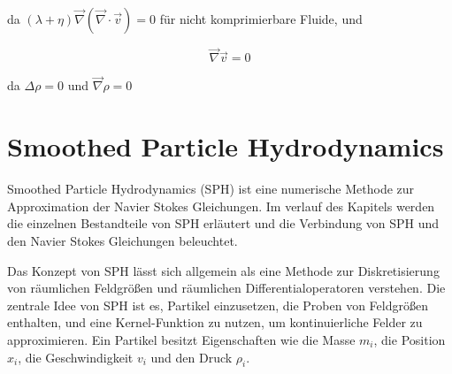 \documentclass[a4paper, 12pt]{article}
\begin{document}
da \((\lambda + \eta)\vec{\nabla}(\vec{\nabla} \cdot \vec{v}) = 0\) für nicht komprimierbare Fluide, und

\begin{equation} \label{equ:einfachKontinuitätsgleichung}
	\vec{\nabla} \vec{v} = 0
\end{equation}

da \(\Delta \rho = 0\) und \(\vec{\nabla}\rho = 0\)

\section{Smoothed Particle Hydrodynamics} \label{section_2}
Smoothed Particle Hydrodynamics (SPH) ist eine numerische Methode zur Approximation der Navier Stokes Gleichungen. Im verlauf des Kapitels werden die einzelnen Bestandteile von SPH erläutert und die Verbindung von SPH und den Navier Stokes Gleichungen beleuchtet.

Das Konzept von SPH lässt sich allgemein als eine Methode zur Diskretisierung von räumlichen Feldgrößen und räumlichen Differentialoperatoren verstehen. Die zentrale Idee von SPH ist es, Partikel einzusetzen, die Proben von Feldgrößen enthalten, und eine Kernel-Funktion zu nutzen, um kontinuierliche Felder zu approximieren. Ein Partikel besitzt Eigenschaften wie die Masse \( m_i \), die Position \( x_i \), die Geschwindigkeit \( v_i \) und den Druck \( \rho_i \).
\end{document}
